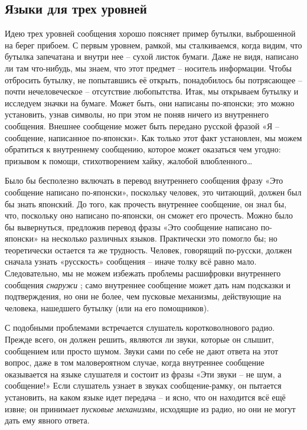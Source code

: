 \documentclass[../main.tex]{subfiles}
\begin{document}
\subsection{Языки для трех уровней}

Идею трех уровней сообщения хорошо поясняет пример бутылки, выброшенной на берег прибоем. С первым уровнем, рамкой, мы сталкиваемся, когда видим, что бутылка запечатана и внутри нее \--- сухой листок бумаги. Даже не видя, написано ли там что-нибудь, мы знаем, что этот предмет \--- носитель информации. Чтобы отбросить бутылку, не попытавшись её открыть, понадобилось бы потрясающее \--- почти нечеловеческое \--- отсутствие любопытства. Итак, мы открываем бутылку и исследуем значки на бумаге. Может быть, они написаны по-японски; это можно установить, узнав символы, но при этом не поняв ничего из внутреннего сообщения. Внешнее сообщение может быть передано русской фразой «Я \--- сообщение, написанное по-японски». Как только этот факт установлен, мы можем обратиться к внутреннему сообщению, которое может оказаться чем угодно: призывом к помощи, стихотворением хайку, жалобой влюбленного\ldots{}

Было бы бесполезно включать в перевод внутреннего сообщения фразу «Это сообщение написано по-японски», поскольку человек, это читающий, должен был бы знать японский. До того, как прочесть внутреннее сообщение, он знал бы, что, поскольку оно написано по-японски, он сможет его прочесть. Можно было бы вывернуться, предложив перевод фразы «Это сообщение написано по-японски» на несколько различных языков. Практически это помогло бы; но теоретически остается та же трудность. Человек, говорящий по-русски, должен сначала узнать «русскость» сообщения \--- иначе толку всё равно мало. Следовательно, мы не можем избежать проблемы расшифровки внутреннего сообщения \emph{снаружи} ; само внутреннее сообщение может дать нам подсказки и подтверждения, но они не более, чем пусковые механизмы, действующие на человека, нашедшего бутылку (или на его помощников).

С подобными проблемами встречается слушатель коротковолнового радио. Прежде всего, он должен решить, являются ли звуки, которые он слышит, сообщением или просто шумом. Звуки сами по себе не дают ответа на этот вопрос, даже в том маловероятном случае, когда внутреннее сообщение оказывается на языке слушателя и состоит из фразы «Эти звуки \--- не шум, а сообщение!» Если слушатель узнает в звуках сообщение-рамку, он пытается установить, на каком языке идет передача \--- и ясно, что он находится всё ещё извне; он принимает \emph{пусковые механизмы}, исходящие из радио, но они не могут дать ему явного ответа.
\end{document}
